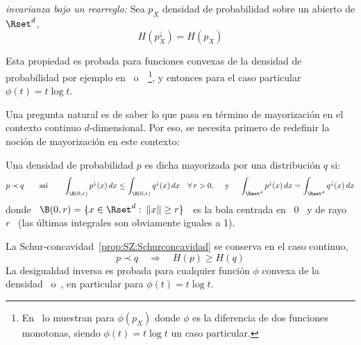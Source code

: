 \begin{propiedadesC}\setcounter{enumi}{\value{PropPermutacion}}
\item\label{prop:SZ:permutacionC} {\it invarianza  bajo un rearreglo:} Sea $p_X$
  densidad de probabilidad sobre un abierto de $\Rset^d$,
  \[
  H\left( p_X^\downarrow \right) = H(p_X)
  \]
\end{propiedadesC}
%
\noindent Esta  propiedad es probada para  funciones convexas de  la densidad de
probabilidad              por             ejemplo             en~\cite{LieLos01}
o~\cite[Lema~7.2]{WanMad04}~\footnote{En~\cite[Sec.~3.3]{LieLos01}  lo  muestran
  para $\phi(p_X)$  donde $\phi$  es la diferencia  de dos  funciones monotonas,
  siendo $\phi(t)  = t  \log t$ un  caso particular.},  y entonces para  el caso
particular $\phi(t) = t \log t$.

Una pregunta natural  es de saber lo que pasa en  t\'ermino de mayorizaci\'on en
el contexto continuo $d$-dimensional. Por  eso, se necesita primero de redefinir
la noci\'on de mayorizaci\'on en este contexto:
%
\begin{definicion}\label{def:SZ:MayorizacionC}
  Una densidad  de probabilidad $p$  es dicha mayorizada por  una distribuci\'on
  $q$ si:
  \[
  p \prec  q \qquad \mbox{ssi}  \qquad \int_{\B(0,r)} p^\downarrow(x) \,  dx \le
  \int_{\B(0,r)} q^\downarrow(x) \, dx \quad \forall  \, r > 0, \quad \mbox{ y }
  \quad \int_{\Rset^d} p^\downarrow(x) \, dx = \int_{\Rset^d} q^\downarrow(x) \,
  dx
  \]
  donde \ $\B(0,r) = \{ x \in \Rset^d:  \: \|x\| \ge r \}$ \ es la bola centrada
  en \ $0$ \ y de rayo  \ $r$ \ (las \'ultimas integrales son obviamente iguales
  a 1).
\end{definicion}
%
\noindent  La Schur-concavidad~\ref{prop:SZ:Schurconcavidad}  se conserva  en el
caso  continuo, \ie
%
\[
p \prec  q  \quad \Rightarrow  \quad H(p)  \ge H(q)
\]
%
La desigualdad inversa es probada  para cualquier funci\'on $\phi$ convexa de la
densidad~\cite{Cho74} o~\cite[Prop.~7.3]{WanMad04},  en particular para $\phi(t)
= t \log t$.

